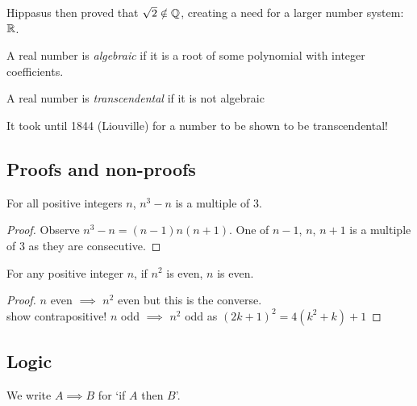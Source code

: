 \documentclass{../../template/note}
\begin{document}
    Hippasus then proved that \(\sqrt 2 \notin \mathbb Q\), creating a need for a larger number system: \(\mathbb R\).

    \begin{definition}
        A real number is \emph{algebraic} if it is a root of some polynomial with integer coefficients.
    \end{definition}

    \begin{definition}
        A real number is \emph{transcendental} if it is not algebraic
    \end{definition}

    \begin{remark*}
        It took until 1844 (Liouville) for a number to be shown to be transcendental!
    \end{remark*}

    \subsection{Proofs and non-proofs}

    \begin{claim}
        For all positive integers \(n\), \(n^3-n\) is a multiple of 3.
    \end{claim}
    
    \begin{proof}
        Observe \(n^3-n=(n-1)n(n+1)\). One of \(n-1\), \(n\), \(n+1\) is a multiple of 3 as they are consecutive.
    \end{proof}
    
    \begin{claim}
        For any positive integer \(n\), if \(n^2\) is even, \(n\) is even.
    \end{claim}
    
    \begin{proof}
        \(n\) even \(\implies\) \(n^2\) even but this is the converse. \\
        show contrapositive! \(n\) odd \(\implies\) \(n^2\) odd as \((2k+1)^2 = 4(k^2+k)+1\)
    \end{proof}


    \subsection{Logic}

    We write \(A \implies B\) for `if \(A\) then \(B\)'.
\end{document}
